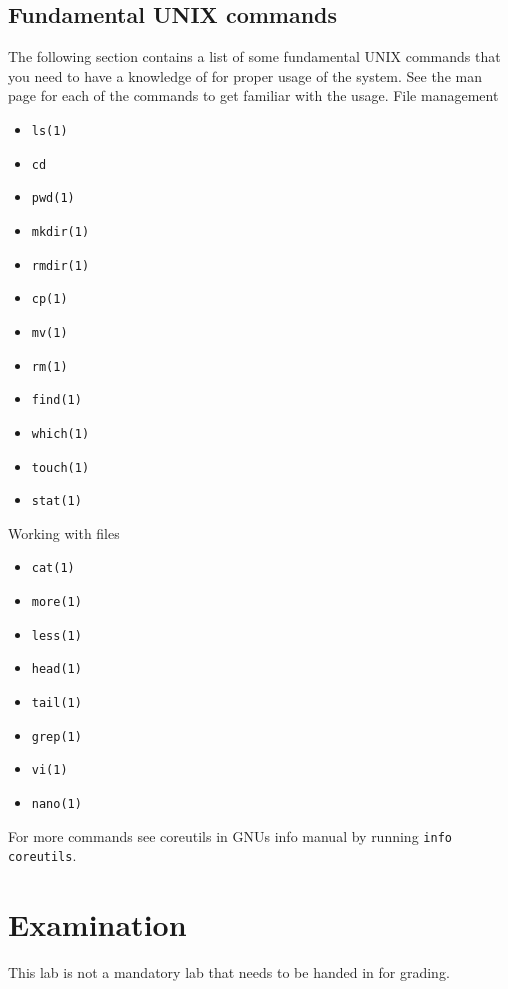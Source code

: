 \documentclass[a4paper]{miunasgn}
\begin{document}
\subsection{Fundamental UNIX commands}
The following section contains a list of some fundamental UNIX commands that you
need to have a knowledge of for proper usage of the system. See the man page for
each of the commands to get familiar with the usage.
File management
\begin{itemize}
  \item \texttt{ls(1)}
  \item \texttt{cd}
  \item \texttt{pwd(1)}
  \item \texttt{mkdir(1)}
  \item \texttt{rmdir(1)}
  \item \texttt{cp(1)}
  \item \texttt{mv(1)}
  \item \texttt{rm(1)}
  \item \texttt{find(1)}
  \item \texttt{which(1)}
  \item \texttt{touch(1)}
  \item \texttt{stat(1)}
\end{itemize}

Working with files
\begin{itemize}
  \item \texttt{cat(1)}
  \item \texttt{more(1)}
  \item \texttt{less(1)}
  \item \texttt{head(1)}
  \item \texttt{tail(1)}
  \item \texttt{grep(1)}
  \item \texttt{vi(1)}
  \item \texttt{nano(1)}
\end{itemize}

For more commands see coreutils in GNUs info manual by running 
\texttt{info coreutils}.


\section{Examination}
\label{sec:exam}
This lab is not a mandatory lab that needs to be handed in for grading.


\printbibliography
\end{document}
